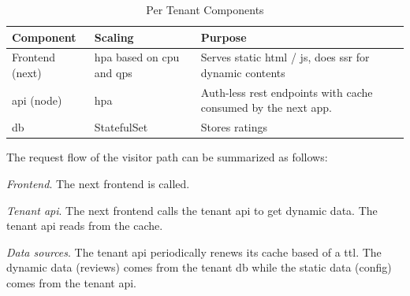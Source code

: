 \documentclass[11pt, a4paper, oneside, listof=totoc]{scrartcl}
\begin{document}
                \begin{table}[H]\label{tab:tenantComponents}
                    \centering
                    \renewcommand{\arraystretch}{1.5}
                    \begin{tabular}{lp{4cm}P{8cm}}
                        \toprule
                        Component & Scaling & Purpose \\
                        \midrule
                        Frontend (\gls{next}) & \gls{hpa} based on \gls{cpu} and \gls{qps} & Serves static \gls{html} / \gls{js}, does \gls{ssr} for dynamic contents \\
                        \gls{api} (\gls{node}) & \gls{hpa} & Auth-less \gls{rest} endpoints with cache consumed by the \gls{next} app. \\
                        \gls{db} & StatefulSet & Stores ratings \\
                        \bottomrule
                    \end{tabular}
                    \caption{Per Tenant Components}
                \end{table}

                The request flow of the visitor path can be summarized as follows:

                \begin{enumerate}[label={[\arabic*]:},
                    ref=Challenge~\arabic*,
                    leftmargin=*,
                    itemsep=0.6\baselineskip]

                    \item\label{chal:frontend}
                        \textit{Frontend}.
                        The \gls{next} frontend is called.
                    \item\label{chal:tenantApi}
                        \textit{Tenant \gls{api}}.
                        The \gls{next} frontend calls the tenant \gls{api} to get dynamic data.
                        The tenant \gls{api} reads from the cache.

                    \item\label{chal:db}
                        \textit{Data sources}.
                        The tenant \gls{api} periodically renews its cache based of a \gls{ttl}.
                        The dynamic data (reviews) comes from the tenant \gls{db} while the static
                        data (config) comes from the tenant \gls{api}.
                \end{enumerate}
\end{document}
